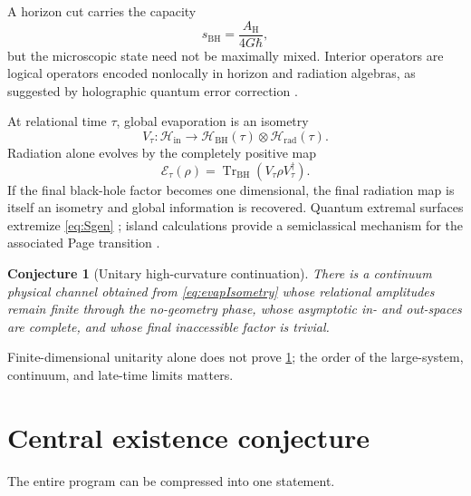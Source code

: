 \documentclass[11pt]{article}
\newtheorem{conjecture}[definition]{Conjecture}
\theoremstyle{remark}
\newcommand{\cH}{\mathcal H}
\newcommand{\Tr}{\operatorname{Tr}}
\begin{document}
A horizon cut carries the capacity
\begin{equation}
  s_{\mathrm{BH}}
  =\frac{A_{\mathrm H}}{4G\hbar},
\end{equation}
but the microscopic state need not be maximally mixed.  Interior
operators are logical operators encoded nonlocally in horizon and
radiation algebras, as suggested by holographic quantum error correction
\cite{ADH2015,Pastawski2015}.

At relational time \(\tau\), global evaporation is an isometry
\begin{equation}
  V_\tau:\cH_{\mathrm{in}}
  \longrightarrow
  \cH_{\mathrm{BH}}(\tau)\otimes\cH_{\mathrm{rad}}(\tau).
  \label{eq:evapIsometry}
\end{equation}
Radiation alone evolves by the completely positive map
\begin{equation}
  \mathcal E_\tau(\rho)
  =
  \Tr_{\mathrm{BH}}\!\left(
    V_\tau\rho V_\tau^\dagger
  \right).
\end{equation}
If the final black-hole factor becomes one dimensional, the final
radiation map is itself an isometry and global information is recovered.
Quantum extremal surfaces extremize \eqref{eq:Sgen}
\cite{EngelhardtWall2015}; island calculations provide a semiclassical
mechanism for the associated Page transition
\cite{Penington2020,Almheiri2020}.

\begin{conjecture}[Unitary high-curvature continuation]
There is a continuum physical channel obtained from
\eqref{eq:evapIsometry} whose relational amplitudes remain finite through
the no-geometry phase, whose asymptotic in- and out-spaces are complete,
and whose final inaccessible factor is trivial.
\label{conj:blackHole}
\end{conjecture}

Finite-dimensional unitarity alone does not prove
\cref{conj:blackHole}; the order of the large-system, continuum, and
late-time limits matters.

\section{Central existence conjecture}

The entire program can be compressed into one statement.
\end{document}
